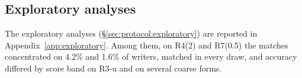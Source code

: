 \subsection{Exploratory analyses}
\label{sec:results:exploratory}

The exploratory analyses (\S\ref{sec:protocol:exploratory}) are reported in Appendix~\ref{app:exploratory}. Among
them, on R4(2) and R7(0.5) the matches concentrated on 4.2\% and 1.6\% of writers, matched in every draw, and accuracy
differed by score band on R3-u and on several coarse forms.
